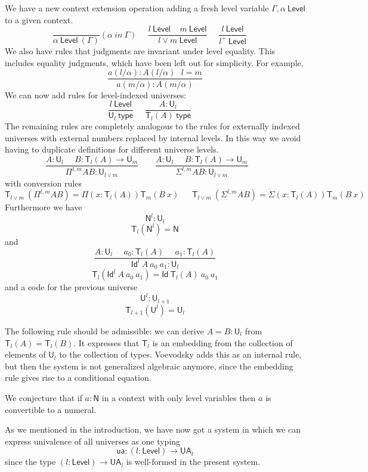 \documentclass[11pt,a4paper]{article}
\newcommand{\Id}{\mathsf{Id}}
\def\NN{\mathsf{N}}
\def\UU{\mathsf{U}}
\def\Level{\mathsf{Level}}
\newcommand{\type}{\mathsf{type}}
\newcommand{\T}{\mathsf{T}}
\newcommand{\ua}{\mathsf{ua}}
\newcommand{\UA}{\mathsf{UA}}
\begin{document}
We have a new context extension operation adding a fresh level variable $\Gamma,\alpha~\Level$
to a given context.
$$
\frac{}{\alpha~\Level~(\Gamma)}(\alpha~in~\Gamma)~~~~~~
\frac{l~\Level~~~~~m~\Level}{l\vee m~\Level}~~~~~~
\frac{l~\Level}{l^+~\Level}~~~~~~
$$
We also have rules that judgments are invariant under level equality.
This includes equality judgments, which have been left out for simplicity.
For example,
$$
\frac{a(l/\alpha) : A(l/\alpha)\ \ \ l = m}
{a(m/\alpha) : A(m/\alpha)}
$$
We can  now add rules for level-indexed universes:
$$
\frac{l~\Level}{\UU_{l}~\type}~~~~~~
\frac{A:\UU_{l}}{\T_{l}(A)~\type}~~~~~~
$$
The remaining rules are completely analogous to the rules for externally indexed universes with external numbers replaced by internal levels. In this way we avoid having to duplicate definitions for different universe levels.
$$
\frac{A:\UU_{l}~~~~~~B:\T_{l}(A)\rightarrow \UU_{m}}
     {\Pi^{l,m} A B:\UU_{l\vee m}}~~~~~~~~~
\frac{A:\UU_{l}~~~~~~B:\T_{l}(A)\rightarrow \UU_{m}}
     {\Sigma^{l,m} A B:\UU_{l\vee m}}~~~~~~~~~
$$
with conversion rules
$$
\T_{l\vee m}~(\Pi^{l,m} A B) = \Pi (x:\T_{l}(A)) \T_{m}(B~x)~~~~~~~
\T_{l\vee m}~(\Sigma^{l,m} A B) = \Sigma (x:\T_{l}(A)) \T_{m}(B~x)~~~~~~~
$$
Furthermore we have $$\NN^{l}:\UU_{l}$$
$$\T_{l}(\NN^{l}) = \NN$$
and
$$
\frac{A:\UU_l~~~~~~a_0:\T_l(A)~~~~~~a_1:\T_l(A)}
{\Id^l~A~a_0~a_1:\UU_l}
$$
$$\T_l(\Id^l~A~a_0~a_1) = \Id~\T_l(A)~a_0~a_1$$
and a code for the previous universe
$${\UU^{l}}:\UU_{l + 1}$$
$$\T_{l + 1}({\UU^{l}}) = \UU_{l}$$

%
%
%
%
%
%
%

The following rule should be admissible:
we can derive $A = B : \UU_l$ from $\T_l(A) = \T_l(B)$.
 It expresses that $\T_l$ is an embedding from the collection of elements of $\UU_l$
 to the collection of types.
 Voevodsky \cite[Rule 20 on p. 17]{VV} adds this as an internal rule, but then the system is not
 generalized algebraic anymore, since the embedding rule gives rise to a conditional equation.

We conjecture that if $a : \NN$ in a context with only level variables
then $a$ is convertible to a numeral.

As we mentioned in the introduction, we have now got a system in which we can express univalence of all universes as one typing
$$
\ua : (l : \Level) \to \UA_l
$$
since the type $(l : \Level) \to \UA_l$ is well-formed in the present system.
\end{document}
